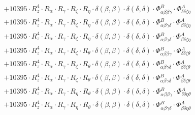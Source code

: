\documentclass{article}
\begin{document}
\begin{subequations}
\begin{gather}
\begin{array}{c}
 \\[0.2em] 		 + 10395 \cdot R_{z}^{4} \cdot R_{\alpha{}} \cdot R_{\gamma{}} \cdot R_{\zeta{}} \cdot R_{\eta{}} \cdot \delta{}\left(\beta{}, \beta{}\right) \cdot \delta{}\left(\delta{}, \delta{}\right) \cdot \Phi{}^{B}_{\alpha{}\beta{}\beta{}\gamma{}} \cdot \Phi{}^{A}_{\delta{}\delta{}\zeta{}\eta{}} 
 \\[0.2em] 		 + 10395 \cdot R_{z}^{4} \cdot R_{\alpha{}} \cdot R_{\gamma{}} \cdot R_{\zeta{}} \cdot R_{\eta{}} \cdot \delta{}\left(\beta{}, \beta{}\right) \cdot \delta{}\left(\delta{}, \delta{}\right) \cdot \Phi{}^{B}_{\alpha{}\beta{}\gamma{}\delta{}} \cdot \Phi{}^{A}_{\beta{}\delta{}\zeta{}\eta{}} 
 \\[0.2em] 		 + 10395 \cdot R_{z}^{4} \cdot R_{\alpha{}} \cdot R_{\gamma{}} \cdot R_{\zeta{}} \cdot R_{\eta{}} \cdot \delta{}\left(\beta{}, \beta{}\right) \cdot \delta{}\left(\delta{}, \delta{}\right) \cdot \Phi{}^{B}_{\alpha{}\beta{}\gamma{}\delta{}} \cdot \Phi{}^{A}_{\beta{}\delta{}\zeta{}\eta{}} 
 \\[0.2em] 		 + 10395 \cdot R_{z}^{4} \cdot R_{\alpha{}} \cdot R_{\gamma{}} \cdot R_{\zeta{}} \cdot R_{\theta{}} \cdot \delta{}\left(\beta{}, \beta{}\right) \cdot \delta{}\left(\delta{}, \delta{}\right) \cdot \Phi{}^{B}_{\alpha{}\beta{}\beta{}\gamma{}} \cdot \Phi{}^{A}_{\delta{}\delta{}\zeta{}\theta{}} 
 \\[0.2em] 		 + 10395 \cdot R_{z}^{4} \cdot R_{\alpha{}} \cdot R_{\gamma{}} \cdot R_{\zeta{}} \cdot R_{\theta{}} \cdot \delta{}\left(\beta{}, \beta{}\right) \cdot \delta{}\left(\delta{}, \delta{}\right) \cdot \Phi{}^{B}_{\alpha{}\beta{}\gamma{}\delta{}} \cdot \Phi{}^{A}_{\beta{}\delta{}\zeta{}\theta{}} 
 \\[0.2em] 		 + 10395 \cdot R_{z}^{4} \cdot R_{\alpha{}} \cdot R_{\gamma{}} \cdot R_{\zeta{}} \cdot R_{\theta{}} \cdot \delta{}\left(\beta{}, \beta{}\right) \cdot \delta{}\left(\delta{}, \delta{}\right) \cdot \Phi{}^{B}_{\alpha{}\beta{}\gamma{}\delta{}} \cdot \Phi{}^{A}_{\beta{}\delta{}\zeta{}\theta{}} 
 \\[0.2em] 		 + 10395 \cdot R_{z}^{4} \cdot R_{\alpha{}} \cdot R_{\gamma{}} \cdot R_{\eta{}} \cdot R_{\theta{}} \cdot \delta{}\left(\beta{}, \beta{}\right) \cdot \delta{}\left(\delta{}, \delta{}\right) \cdot \Phi{}^{B}_{\alpha{}\beta{}\beta{}\gamma{}} \cdot \Phi{}^{A}_{\delta{}\delta{}\eta{}\theta{}} 
 \\[0.2em] 		 + 10395 \cdot R_{z}^{4} \cdot R_{\alpha{}} \cdot R_{\gamma{}} \cdot R_{\eta{}} \cdot R_{\theta{}} \cdot \delta{}\left(\beta{}, \beta{}\right) \cdot \delta{}\left(\delta{}, \delta{}\right) \cdot \Phi{}^{B}_{\alpha{}\beta{}\gamma{}\delta{}} \cdot \Phi{}^{A}_{\beta{}\delta{}\eta{}\theta{}} 

\end{array}
\end{gather}
\end{subequations}
\end{document}

